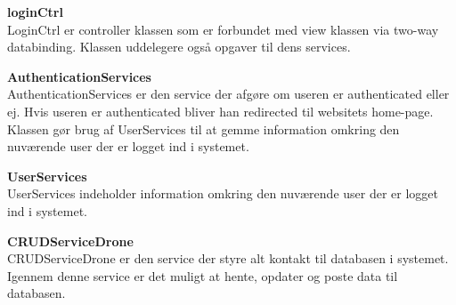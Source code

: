 \textbf{loginCtrl} \\
LoginCtrl er controller klassen som er forbundet med view klassen via two-way databinding. Klassen uddelegere også opgaver til dens services.

\textbf{AuthenticationServices} \\
AuthenticationServices er den service der afgøre om useren er authenticated eller ej. Hvis useren er authenticated bliver han redirected til websitets home-page. Klassen gør brug af UserServices til at gemme information omkring den nuværende user der er logget ind i systemet.

\textbf{UserServices}\\
UserServices indeholder information omkring den nuværende user der er logget ind i systemet.

\textbf{CRUDServiceDrone} \\
CRUDServiceDrone er den service der styre alt kontakt til databasen i systemet. Igennem denne service er det muligt at hente, opdater og poste data til databasen.